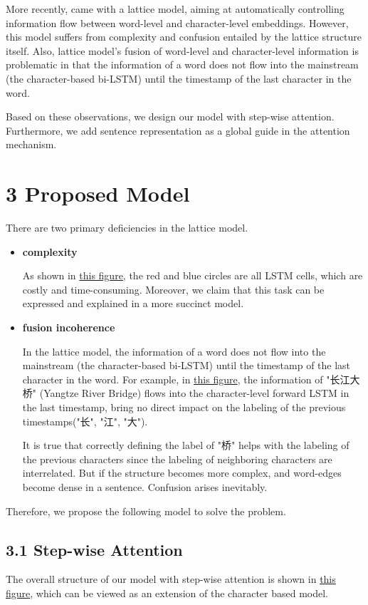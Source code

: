 \documentclass[letterpaper]{article} %
\begin{document}
More recently, \cite{lattice} came with a lattice model, aiming at automatically controlling information flow between word-level and character-level embeddings. However, this model suffers from complexity and confusion entailed by the lattice structure itself. Also, lattice model's fusion of word-level and character-level information is problematic in that the information of a word does not flow into the mainstream (the character-based bi-LSTM) until the timestamp of the last character in the word. 

Based on these observations, we design our model with step-wise attention. Furthermore, we add sentence representation as a global guide in the attention mechanism. 


\section{3 Proposed Model}
There are two primary deficiencies in the lattice model.
\begin{itemize}
\setlength{\itemsep}{12pt}
\item 
\textbf{complexity}

As shown in \hyperref[fig:lattice]{this figure}, the red and blue circles are all LSTM cells, which are costly and time-consuming. Moreover, we claim that this task can be expressed and explained in a more succinct model.

\item \textbf{fusion incoherence}

In the lattice model, the information of a word does not flow into the mainstream (the character-based bi-LSTM) until the timestamp of the last character in the word. For example, in \hyperref[fig:lattice]{this figure}, the information of "长江大桥" (Yangtze River Bridge) flows into the character-level forward LSTM in the last timestamp, bring no direct impact on the labeling of the previous timestamps("长", "江", "大"). 

It is true that correctly defining the label of "桥" helps with the labeling of the previous characters since the labeling of neighboring characters are interrelated. But if the structure becomes more complex, and word-edges become dense in a sentence. Confusion arises inevitably.
\end{itemize}

Therefore, we propose the following model to solve the problem.

\subsection{3.1 Step-wise Attention}
The overall structure of our model with step-wise attention is shown in \hyperref[fig:our]{this figure}, which can be viewed as an extension of the character based model.
\end{document}
